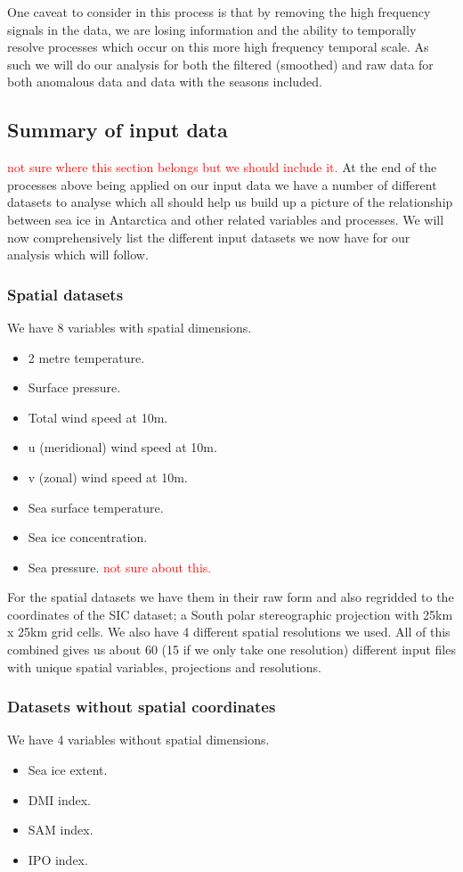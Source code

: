 One caveat to consider in this process is that by removing the high frequency signals in the data, we are losing information and the ability to temporally resolve processes which occur on this more high frequency temporal scale. As such we will do our analysis for both the filtered (smoothed) and raw data for both anomalous data and data with the seasons included.



\subsection{Summary of input data}
\textcolor{red}{not sure where this section belongs but we should include it.}
At the end of the processes above being applied on our input data we have a number of different datasets to analyse which all should help us build up a picture of the relationship between sea ice in Antarctica and other related variables and processes. We will now comprehensively list the different input datasets we now have for our
analysis which will follow.

\subsubsection*{Spatial datasets}
We have 8 variables with spatial dimensions.
\begin{itemize}
    \item 2 metre temperature.
    \item Surface pressure.
    \item Total wind speed at 10m.
    \item u (meridional) wind speed at 10m.
    \item v (zonal) wind speed at 10m.
    \item Sea surface temperature.
    \item Sea ice concentration.
    \item Sea pressure. \textcolor{red}{not sure about this.}
\end{itemize}

For the spatial datasets we have them in their raw form and also regridded to the coordinates of the SIC dataset; a South polar stereographic projection with 25km x 25km grid cells.
We also have 4 different spatial resolutions we used.
All of this combined gives us about 60 (15 if we only take one resolution) different input files with unique spatial variables, projections and resolutions.

\subsubsection*{Datasets without spatial coordinates}
We have 4 variables without spatial dimensions.
\begin{itemize}
    \item Sea ice extent.
    \item DMI index.
    \item SAM index.
    \item IPO index.
\end{itemize}

